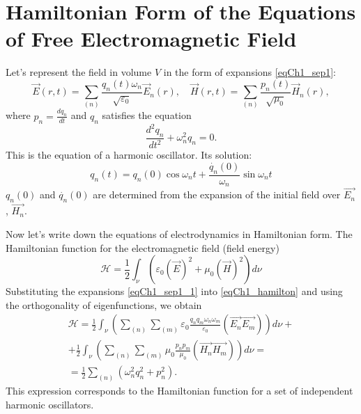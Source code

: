\section{Hamiltonian Form of the Equations of Free Electromagnetic Field}
Let's represent the field in volume $V$ in the form of expansions \eqref{eqCh1_sep1}:
\begin{equation}
\vec{E}\left(r, t\right) = \sum_{(n)}
\frac{q_n\left(t\right) \omega_n}{\sqrt{\varepsilon_0}} \vec{E}_n\left(r\right),
\quad
\vec{H}\left(r, t\right) = \sum_{(n)}
\frac{p_n\left(t\right)}{\sqrt{\mu_0}} \vec{H}_n\left(r\right),
\label{eqCh1_sep1_1}
\end{equation}
where $p_n = \frac{d q_n}{d t}$ and $q_n$ satisfies the equation
\[
\frac{d^2 q_n}{d t^2} + \omega_n^2 q_n = 0.
\]
This is the equation of a harmonic oscillator. Its solution:
\begin{equation}
q_n\left(t\right) = q_n\left(0\right) \cos \omega_n t + 
\frac{\dot{q_n}\left(0\right)}{\omega_n} \sin \omega_n t 
\end{equation}
$q_n\left(0\right)$ and 
$\dot{q_n}\left(0\right)$ 
are determined from the expansion of the initial field over  
$\vec{E_n}$, $\vec{H_n}$.
 
Now let's write down the equations of electrodynamics in Hamiltonian form. The Hamiltonian function for the electromagnetic field (field energy)
\begin{equation}
\mathcal{H} = \frac{1}{2}
\int_{\nu}\left( \varepsilon_0\left(\vec{E}\right)^2 + \mu_0
\left(\vec{H}\right)^2\right) d\nu
\label{eqCh1_hamilton}
\end{equation}
Substituting the expansions \eqref{eqCh1_sep1_1} into \eqref{eqCh1_hamilton} and using the orthogonality of eigenfunctions, we obtain 
\begin{eqnarray}
\mathcal{H} = \frac{1}{2} 
\int_{\nu}\left( \sum_{(n)} \sum_{(m)}\varepsilon_0
\frac{q_n q_m \omega_n \omega_m}{\varepsilon_0}
\left( \vec{E_n} \vec{E_m}\right)
\right) d\nu +
\nonumber \\
+  \frac{1}{2} 
\int_{\nu}\left( \sum_{(n)} \sum_{(m)}\mu_0
\frac{p_n p_m}{\mu_0}
\left( \vec{H_n} \vec{H_m}\right)
\right) d\nu =
\nonumber \\
= \frac{1}{2}\sum_{(n)}\left(\omega_n^2 q_n^2 + p_n^2\right).
\end{eqnarray}
This expression corresponds to the Hamiltonian function for a set of independent harmonic oscillators. 

